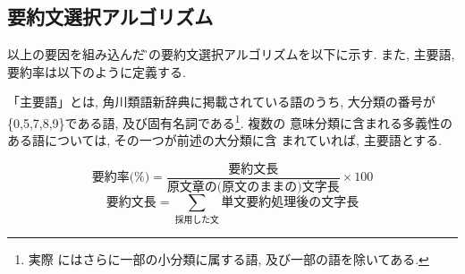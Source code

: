 \subsection{要約文選択アルゴリズム}
以上の要因を組み込んだ\G での要約文選択アルゴリズムを以下に示す. また, 
主要語, 要約率は以下のように定義する. 

\vspace{5mm plus 5mm}
\begin{定義}
「主要語」とは, 角川類語新辞典\cite{角川類語}に掲載されている語のうち, 
大分類の番号が\{0,5,7,8,9\}である語, 及び固有名詞である\footnote{実際
にはさらに一部の小分類に属する語, 及び一部の語を除いてある. }. 複数の
意味分類に含まれる多義性のある語については, その一つが前述の大分類に含
まれていれば, 主要語とする. 
\end{定義}

\begin{equation}
\mbox{要約率(\%)} = \frac{\mbox{要約文長}}{\mbox{原文章の(原文のままの)文字長}} \times 100
\end{equation}
\begin{equation}
\mbox{要約文長} =  \sum_{\mbox{採用した文}}\mbox{単文要約処理後の文字長}
\end{equation}

\vspace{10mm plus 10mm}

